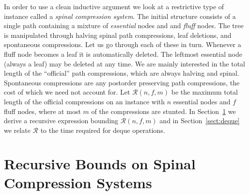 \documentclass{article}
\newcommand{\Rec}{\mathscr{R}}
\begin{document}
In order to use a clean inductive argument we look at a restrictive type of instance called
a {\em spinal compression system}.
The initial structure consists of a single path containing a mixture of {\em essential} nodes and
and {\em fluff} nodes.  The tree is manipulated through halving spinal path compressions, 
leaf deletions, and spontaneous compressions.   Let us
go through each of these in turn.  Whenever a fluff node becomes a leaf it is automatically deleted. 
The leftmost essential node (always a leaf) may be deleted at any time.
We are mainly interested in the total length of the ``official'' path compressions,
which are always halving and spinal.  Spontaneous compressions are any postorder preserving path compressions,
the cost of which we need not account for.
Let $\Rec(n,f,m)$ be the maximum total length of the official compressions on an instance with 
$n$ essential nodes and $f$ fluff nodes, where at most $m$ of the compressions are stunted.
In Section~\ref{sect:pc} we derive a recursive expression bounding $\Rec(n,f,m)$ and in Section~\ref{sect:deque}
we relate $\Rec$ to the time required for deque operations.

\section{Recursive Bounds on Spinal Compression Systems}\label{sect:pc}
\end{document}
